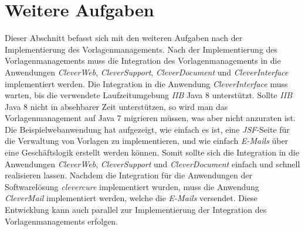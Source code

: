 \section{Weitere Aufgaben}
Dieser Abschnitt befasst sich mit den weiteren Aufgaben nach der Implementierung des Vorlagenmanagements.
\newline
\newline
Nach der Implementierung des Vorlagenmanagements muss die Integration des Vorlagenmanagements in die Anwendungen \emph{CleverWeb}, \emph{CleverSupport}, \emph{CleverDocument} und \emph{CleverInterface} implementiert werden. Die Integration in die Anwendung \emph{CleverInterface} muss warten, bis die verwendete Laufzeitumgebung \emph{IIB} Java 8 unterstützt. Sollte \emph{IIB} Java 8 nicht in absehbarer Zeit unterstützen, so wird man das Vorlagenmanagement auf Java 7 migrieren müssen, was aber nicht anzuraten ist. Die Beispielwebanwendung hat aufgezeigt, wie einfach es ist, eine \emph{JSF}-Seite für die Verwaltung von Vorlagen zu implementieren, und wie einfach \emph{E-Mails} über eine Geschäftslogik erstellt werden können. Somit sollte sich die Integration in die Anwendungen \emph{CleverWeb}, \emph{CleverSupport} und \emph{CleverDocument} einfach und schnell realisieren lassen. 
\newline
\newline
Nachdem die Integration für die Anwendungen der Softwarelösung \emph{clevercure} implementiert wurden, muss die Anwendung \emph{CleverMail} implementiert werden, welche die \emph{E-Mails} versendet. Diese Entwicklung kann auch parallel zur Implementierung der Integration des Vorlagenmanagements erfolgen.

